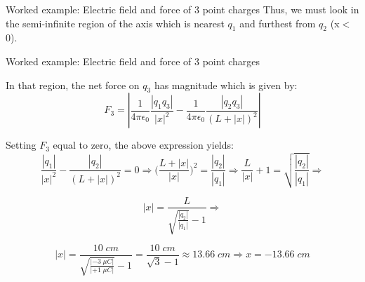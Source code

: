 {\begin{frame}{Worked example: Electric field and force of 3 point charges}
  Thus, we must look in the semi-infinite region of the axis which is nearest
  $q_1$ and furthest from $q_2$ (x$<$0).

\end{frame}

%
%
%

\begin{frame}{Worked example: Electric field and force of 3 point charges}

  In that region, the net force on $q_3$ has magnitude which is given by:
  \begin{equation*}
     F_{3} = \left\rvert
               \frac{1}{4\pi\epsilon_0} \frac{|q_1 q_3|}{|x|^2} -
               \frac{1}{4\pi\epsilon_0} \frac{|q_2 q_3|}{(L+|x|)^2}
              \right\rvert
  \end{equation*}

  Setting $F_{3}$ equal to zero, the above expression yields:
  \begin{equation*}
    \frac{|q_1|}{|x|^2} - \frac{|q_2|}{(L+|x|)^2} = 0 \Rightarrow
    \Big(\frac{L+|x|}{|x|} \Big)^{2} = \frac{|q_2|}{|q_1|} \Rightarrow
    \frac{L}{|x|} + 1 = \sqrt{\frac{|q_2|}{|q_1|}} \Rightarrow
  \end{equation*}

  \begin{equation*}
    |x| = \frac{L}{\sqrt{\frac{|q_2|}{|q_1|}} - 1} \Rightarrow
  \end{equation*}

  \begin{equation*}
    |x| = \frac{10\;cm}{\sqrt{\frac{|-3\;{\mu}C|}{|+1\;{\mu}C|}} - 1}
        = \frac{10\;cm}{\sqrt{3} - 1} \approx 13.66 \; cm
    \Rightarrow x = -13.66 \; cm
  \end{equation*}

\end{frame}

} %


%
%

